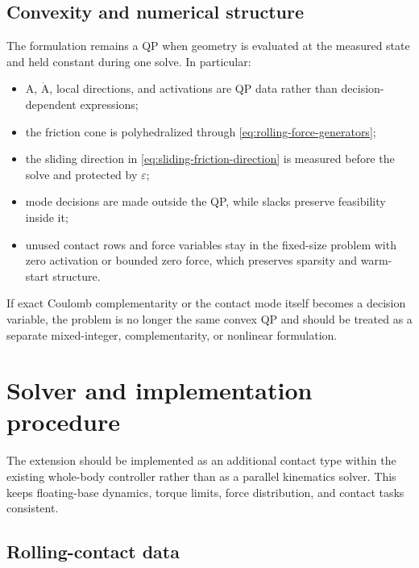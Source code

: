 \documentclass[10pt]{article}
\newcommand{\rollingMatrix}{\text{A}}
\begin{document}
\subsection{Convexity and numerical structure}

The formulation remains a QP when geometry is evaluated at the measured state
and held constant during one solve. In particular:

\begin{itemize}
  \item $\rollingMatrix$, $\dot{\rollingMatrix}$, local directions, and
    activations are QP data rather than decision-dependent expressions;
  \item the friction cone is polyhedralized through
    \eqref{eq:rolling-force-generators};
  \item the sliding direction in \eqref{eq:sliding-friction-direction} is
    measured before the solve and protected by $\varepsilon$;
  \item mode decisions are made outside the QP, while slacks preserve
    feasibility inside it;
  \item unused contact rows and force variables stay in the fixed-size problem
    with zero activation or bounded zero force, which preserves sparsity and
    warm-start structure.
\end{itemize}

If exact Coulomb complementarity or the contact mode itself becomes a decision
variable, the problem is no longer the same convex QP and should be treated as
a separate mixed-integer, complementarity, or nonlinear formulation.

\section{Solver and implementation procedure}
\label{sec:rolling-implementation}

The extension should be implemented as an additional contact type within the
existing whole-body controller rather than as a parallel kinematics solver.
This keeps floating-base dynamics, torque limits, force distribution, and
contact tasks consistent.

\subsection{Rolling-contact data}
\end{document}
